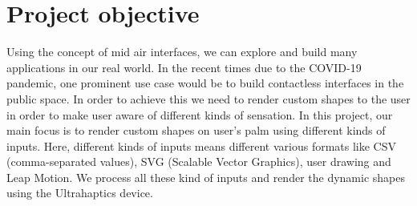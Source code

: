 \section{Project objective}
\label{sec:intro:objective}

Using the concept of mid air interfaces, we can explore and build many applications in our real world. In the recent times due to the COVID-19 pandemic, one prominent use case would be to build contactless interfaces in the public space. In order to achieve this we need to render custom shapes to the user in order to make user aware of different kinds of sensation.
In this project, our main focus is to render custom shapes on user's palm using different kinds of inputs. Here, different kinds of inputs means different various formats like CSV (comma-separated values), SVG (Scalable Vector Graphics), user drawing and Leap Motion. We process all these kind of inputs and render the dynamic shapes using the Ultrahaptics device. 



